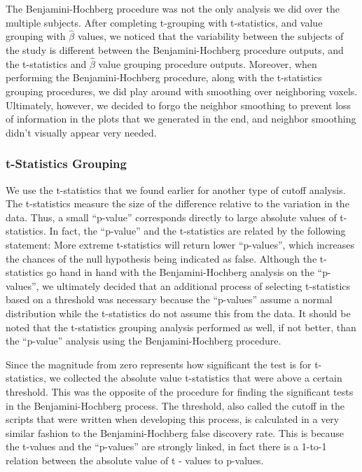 \par The Benjamini-Hochberg procedure was not the only analysis we did over the
multiple subjects. After completing t-grouping with t-statistics, and value 
grouping with $\hat{\beta}$ values, we noticed that the variability between the
subjects of the study is different between the Benjamini-Hochberg procedure 
outputs, and the t-statistics and $\hat{\beta}$ value grouping procedure 
outputs. Moreover, when performing the Benjamini-Hochberg procedure, along with
the t-statistics grouping procedures, we did play around with smoothing over 
neighboring voxels. Ultimately, however, we decided to forgo the neighbor 
smoothing to prevent loss of information in the plots that we generated in the 
end, and neighbor smoothing didn't visually appear very needed.



\subsubsection{t-Statistics Grouping}

\par We use the t-statistics that we found earlier for another type of cutoff
analysis. The t-statistics measure the size of the difference relative to the 
variation in the data. Thus, a small ``p-value'' corresponds directly to large
absolute values of t-statistics. In fact, the ``p-value'' and the t-statistics
are related by the following statement: More extreme t-statistics will return 
lower ``p-values'', which increases the chances of the null hypothesis being 
indicated as false. Although the t-statistics go hand in hand with the 
Benjamini-Hochberg analysis on the ``p-values'', we ultimately decided that an 
additional process of selecting t-statistics based on a threshold was 
necessary because the ``p-values'' assume a normal distribution while the 
t-statistics do not assume this from the data. It should be noted that the 
t-statistics grouping analysis performed as well, if not better, than the 
``p-value'' analysis using the Benjamini-Hochberg procedure.

\par Since the magnitude from zero represents how significant the test is for
t-statistics, we collected the absolute value t-statistics that were above a 
certain threshold. This was the opposite of the procedure for finding the 
significant tests in the Benjamini-Hochberg process. The threshold, also called
the cutoff in the scripts that were written when developing this process, is 
calculated in a very similar fashion to the Benjamini-Hochberg false discovery 
rate. This is because the t-values and the ``p-values'' are strongly linked, in 
fact there is a 1-to-1 relation between the absolute value of t - values to 
p-values.

